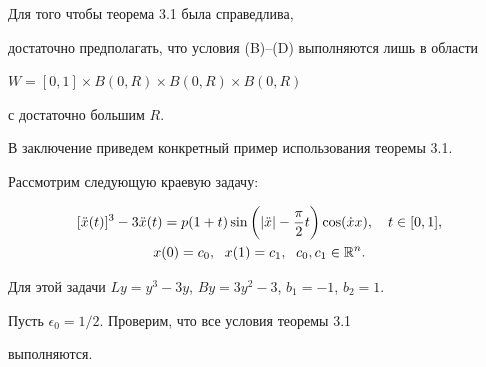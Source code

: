 \begin{notes}


Для того чтобы теорема 3.1 была справедлива,


достаточно предполагать, что условия (B)--(D) выполняются лишь в области 


$W=[0,1]\times B(0, R)\times B(0, R)\times B(0, R)$


с достаточно большим $R$.


\end{notes}





В заключение приведем конкретный пример использования теоремы 3.1.


Рассмотрим следующую краевую задачу:


\begin{gather*}


[\Ddot x(t)]^3 - 3\Ddot x (t) =


p(1+t)\sin\bigg(|\Ddot x| - \frac \pi 2 t\bigg)


\cos(\Dot x x),\quad t\in [0,1], \\


%


x(0)=c_0,\ \; x(1)=c_1,\ \; c_0,c_1\in {\Bbb R}^n.


\end{gather*}


Для этой задачи $L y = y^3-3y$, $B y = 3y^2 - 3$, $b_1=-1$, $b_2 = 1$.


Пусть $\epsilon_0 = 1/2$. Проверим, что все условия теоремы 3.1


выполняются.


